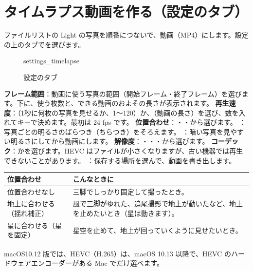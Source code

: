 \clearpage
\section{タイムラプス動画を作る（設定のタブ）}\label{sec:timelapse}

ファイルリストの Light の写真を順番につないで、動画（MP4）にします。設定の上のタブでを選びます。

\begin{figure}[H]
\centering
\begin{screenshot}[0.46\linewidth]{settings_timelapse}
\end{screenshot}
\caption{設定のタブ}
\end{figure}

\begin{callouts}
 \textbf{フレーム範囲}：動画に使う写真の範囲（開始フレーム・終了フレーム）を選びます。下に、使う枚数と、できる動画のおよその長さが表示されます。
 \textbf{再生速度}：（1秒に何枚の写真を見せるか、1〜120）か、（動画の長さ）を選び、数を入れてキーで決めます。最初は 24 fps です。
 \textbf{位置合わせ}：・・から選びます。
 ：写真ごとの明るさのばらつき（ちらつき）をそろえます。
 ：暗い写真を見やすい明るさにしてから動画にします。
 \textbf{解像度}：・・・から選びます。
 \textbf{コーデック}：かを選びます。HEVC はファイルが小さくなりますが、古い機器では再生できないことがあります。
 ：保存する場所を選んで、動画を書き出します。
\end{callouts}

\begin{center}
\small
\begin{tabularx}{\linewidth}{l X}
\toprule
位置合わせ & こんなときに \\
\midrule
位置合わせなし & 三脚でしっかり固定して撮ったとき。 \\
地上に合わせる（揺れ補正） & 風で三脚がゆれた、追尾撮影で地上が動いたなど、地上を止めたいとき（星は動きます）。 \\
星に合わせる（星を固定） & 星空を止めて、地上が回っていくように見せたいとき。 \\
\bottomrule
\end{tabularx}
\end{center}

\begin{memo}[macOS10.12 版]
\textsf{macOS10.12} 版では、HEVC（H.265）は、macOS 10.13 以降で、HEVC のハードウェアエンコーダーがある Mac でだけ選べます。
\end{memo}
